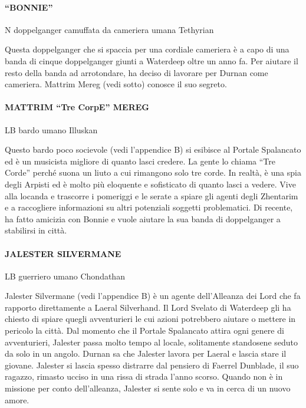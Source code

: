 \documentclass{article}
\begin{document}
                \paragraph{“BONNIE”}
N doppelganger camuffata da cameriera umana Tethyrian

Questa doppelganger che si spaccia per una cordiale cameriera è a capo di una banda di cinque doppelganger giunti a Waterdeep oltre un anno fa. Per aiutare il resto della banda ad arrotondare, ha deciso di lavorare per Durnan come cameriera. Mattrim Mereg (vedi sotto) conosce il suo segreto.

                \paragraph{MATTRIM “Tre CorpE” MEREG}
LB bardo umano Illuskan

Questo bardo poco socievole (vedi l'appendice B) si esibisce al Portale Spalancato ed è un musicista migliore di quanto lasci credere. La gente lo chiama “Tre Corde” perché suona un liuto a cui rimangono solo tre corde. In realtà, è una spia degli Arpisti ed è molto più eloquente e sofisticato di quanto lasci a vedere. Vive alla locanda e trascorre i pomeriggi e le serate a spiare gli agenti degli Zhentarim e a raccogliere informazioni su altri potenziali soggetti problematici. Di recente, ha fatto amicizia con Bonnie e vuole aiutare la sua banda di doppelganger a stabilirsi in città.

                \paragraph{JALESTER SILVERMANE}
LB guerriero umano Chondathan

Jalester Silvermane (vedi l'appendice B) è un agente dell'Alleanza dei Lord che fa rapporto direttamente a Laeral Silverhand. Il Lord Svelato di Waterdeep gli ha chiesto di spiare quegli avventurieri le cui azioni potrebbero aiutare o mettere in pericolo la città. Dal momento che il Portale Spalancato attira ogni genere di avventurieri, Jalester passa molto tempo al locale, solitamente standosene seduto da solo in un angolo. Durnan sa che Jalester lavora per Laeral e lascia stare il giovane. Jalester si lascia spesso distrarre dal pensiero di Faerrel Dunblade, il suo ragazzo, rimasto ucciso in una rissa di strada l’anno scorso. Quando non è in missione per conto dell'alleanza, Jalester si sente solo e va in cerca di un nuovo amore.
\end{document}
